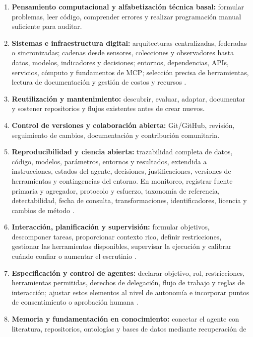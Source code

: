 \documentclass[11pt,a4paper]{article}
\begin{document}
\begin{enumerate}
  \item \textbf{Pensamiento computacional y alfabetización técnica basal:}
  formular problemas, leer código, comprender errores y realizar programación
  manual suficiente para auditar.
  \item \textbf{Sistemas e infraestructura digital:} arquitecturas centralizadas,
  federadas o sincronizadas; cadenas desde sensores, colecciones y observadores
  hasta datos, modelos, indicadores y decisiones; entornos, dependencias, APIs,
  servicios, cómputo y fundamentos de MCP; selección precisa de herramientas,
  lectura de documentación y gestión de costos y recursos
  \citep{feng2022databases,westerlaken2024digital}.
  \item \textbf{Reutilización y mantenimiento:} descubrir, evaluar, adaptar,
  documentar y sostener repositorios y flujos existentes antes de crear nuevos.
  \item \textbf{Control de versiones y colaboración abierta:} Git/GitHub,
  revisión, seguimiento de cambios, documentación y contribución comunitaria.
  \item \textbf{Reproducibilidad y ciencia abierta:} trazabilidad completa de
  datos, código, modelos, parámetros, entornos y resultados, extendida a
  instrucciones, estados del agente, decisiones, justificaciones, versiones de
  herramientas y contingencias del entorno. En monitoreo, registrar fuente
  primaria y agregador, protocolo y esfuerzo, taxonomía de referencia,
  detectabilidad, fecha de consulta, transformaciones, identificadores, licencia y
  cambios de método \citep{wei2025agentic,feng2022databases,buckland2005monitoring}.
  \item \textbf{Interacción, planificación y supervisión:} formular objetivos,
  descomponer tareas, proporcionar contexto rico, definir restricciones, gestionar
  las herramientas disponibles, supervisar la ejecución y calibrar cuándo confiar
  o aumentar el escrutinio \citep{wei2025agentic}.
  \item \textbf{Especificación y control de agentes:} declarar objetivo, rol,
  restricciones, herramientas permitidas, derechos de delegación, flujo de trabajo
  y reglas de interacción; ajustar estos elementos al nivel de autonomía e
  incorporar puntos de consentimiento o aprobación humana
  \citep{schneider2025generative}.
  \item \textbf{Memoria y fundamentación en conocimiento:} conectar el agente con
  literatura, repositorios, ontologías y bases de datos mediante recuperación de

\end{enumerate}
\end{document}
